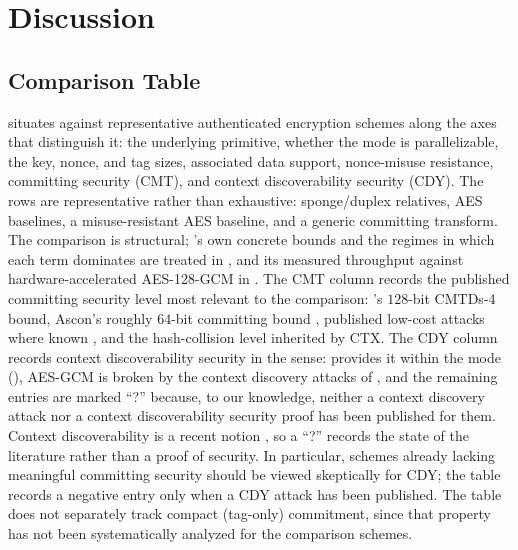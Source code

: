 \section{Discussion}
\label{sec:discussion}

\subsection{Comparison Table}
\label{sec:compare-table}

 situates \TW{} against representative authenticated
encryption schemes along the axes that distinguish it: the underlying primitive,
whether the mode is parallelizable, the key, nonce, and tag sizes, associated data
support, nonce-misuse resistance, committing security (CMT), and context
discoverability security (CDY). The rows are representative rather than
exhaustive: sponge/duplex relatives, AES baselines, a misuse-resistant AES
baseline, and a generic committing transform.
The comparison is structural; \TW{}'s own concrete bounds and the regimes in
which each term dominates are treated in , and its
measured throughput against hardware-accelerated AES-128-GCM in
. The CMT column records the published committing
security level most relevant to the comparison: \TW{}'s $128$-bit
\textsf{CMTDs-4} bound, Ascon's roughly $64$-bit committing bound
\cite{KSW23}, published low-cost attacks where known
\cite{KSW23,CR22,ADGKLS22}, and the hash-collision level inherited by
\textsf{CTX}. The CDY column records context discoverability security in the
\cite{MLGR23} sense: \TW{} provides it within the mode
(), AES-GCM is broken by the context discovery attacks of
\cite{MLGR23}, and the remaining entries are marked ``?'' because, to our
knowledge, neither a context discovery attack nor a context discoverability
security proof has been published for them. Context discoverability is a recent
notion \cite{MLGR23}, so a ``?'' records the state of the literature rather than
a proof of security. In particular, schemes already lacking meaningful
committing security should be viewed skeptically for CDY; the table records a
negative entry only when a CDY attack has been published.
The table does not separately track compact (tag-only) commitment, since
that property has not been systematically analyzed for the comparison
schemes.

